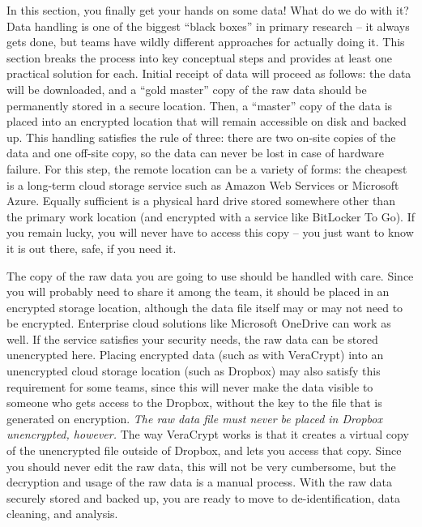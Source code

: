 In this section, you finally get your hands on some data!
What do we do with it? Data handling is one of the biggest
``black boxes'' in primary research -- it always gets done,
but teams have wildly different approaches for actually doing it.
This section breaks the process into key conceptual steps
and provides at least one practical solution for each.
Initial receipt of data will proceed as follows:
the data will be downloaded, and a ``gold master'' copy
of the raw data should be permanently stored in a secure location.
Then, a ``master'' copy of the data is placed into an encrypted location
that will remain accessible on disk and backed up.
This handling satisfies the rule of three:
there are two on-site copies of the data and one off-site copy,
so the data can never be lost in case of hardware failure.
For this step, the remote location can be a variety of forms:
the cheapest is a long-term cloud storage service
such as Amazon Web Services or Microsoft Azure.
Equally sufficient is a physical hard drive
stored somewhere other than the primary work location
(and encrypted with a service like BitLocker To Go).
If you remain lucky, you will never have to access this copy --
you just want to know it is out there, safe, if you need it.

The copy of the raw data you are going to use
should be handled with care.
Since you will probably need to share it among the team,
it should be placed in an encrypted storage location,
although the data file itself may or may not need to be encrypted.
Enterprise cloud solutions like Microsoft OneDrive can work as well.
If the service satisfies your security needs,
the raw data can be stored unencrypted here.
Placing encrypted data (such as with VeraCrypt)
into an unencrypted cloud storage location (such as Dropbox)
may also satisfy this requirement for some teams,
since this will never make the data visible to someone
who gets access to the Dropbox,
without the key to the file that is generated on encryption.
\textit{The raw data file must never be placed in Dropbox unencrypted, however.}
The way VeraCrypt works is that it creates a virtual copy
of the unencrypted file outside of Dropbox, and lets you access that copy.
Since you should never edit the raw data, this will not be very cumbersome,
but the decryption and usage of the raw data is a manual process.
With the raw data securely stored and backed up,
you are ready to move to de-identification, data cleaning, and analysis.
